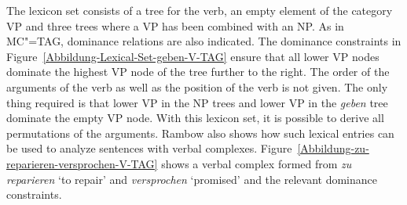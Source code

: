 The lexicon set consists of a tree for the verb, an empty element of the category VP and three trees where a VP has been combined with
an NP. As in MC"=TAG, dominance relations are also indicated. The dominance constraints in Figure~\ref{Abbildung-Lexical-Set-geben-V-TAG}
ensure that all lower VP nodes dominate the highest VP node of the tree further to the right. The order of the arguments of the verb as
well as the position of the verb is not given. The only thing required is that lower VP in the NP
trees and lower VP in the \emph{geben} tree dominate the empty VP node.
With this lexicon set, it is possible to derive all permutations of the arguments. Rambow also shows
how such lexical entries can be used to analyze sentences with verbal complexes. Figure~\vref{Abbildung-zu-reparieren-versprochen-V-TAG} shows a verbal complex formed from
\emph{zu reparieren} `to repair' and \emph{versprochen} `promised' and the relevant dominance constraints.
